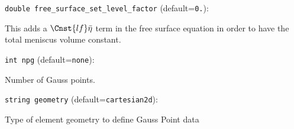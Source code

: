 \item\verb+double free_surface_set_level_factor+ {\rm(default=\verb|0.|)}:

This adds a $\Cnst{lf}\bar\eta$ term in the free surface equation
in order to have the total meniscus volume constant. 

\item\verb+int npg+ {\rm(default=\verb|none|)}:

Number of Gauss points.

\item\verb+string geometry+ {\rm(default=\verb|cartesian2d|)}:

Type of element geometry to define Gauss Point data

